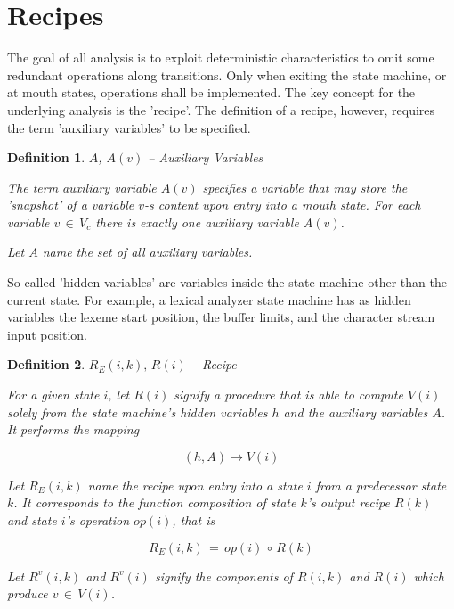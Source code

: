 \documentclass[12pt,a4paper]{scrartcl}
\newtheorem{definition}{Definition}
\begin{document}
%
\section{Recipes}

The goal of all analysis is to exploit deterministic characteristics to omit some
redundant operations along transitions.  Only when exiting the state
machine, or at mouth states, operations shall be implemented. The key concept
for the underlying analysis is the 'recipe'. The definition of a recipe,
however, requires the term 'auxiliary variables' to be specified.

\begin{definition} $A$, $A(v)$ -- Auxiliary Variables

The term auxiliary variable $A(v)$ specifies a variable that may store the
'snapshot' of a variable $v$-s content upon entry into a mouth state. For each
variable $v\,\in\,V_c$ there is exactly one auxiliary variable $A(v)$.
   
Let $A$ name the set of all auxiliary variables.
\end{definition}

So called 'hidden variables' are variables inside the state machine other than
the current state.  For example, a lexical analyzer state machine has as hidden
variables the lexeme start position, the buffer limits, and the character
stream input position.

\begin{definition} $R_E(i,k),\,R(i)$ -- Recipe 

For a given state $i$, let $R(i)$ signify a procedure that is able to compute
$V(i)$ solely from the state machine's hidden variables $h$ and the auxiliary
variables $A$.  It performs the mapping

\begin{equation} \label{eq:recipe-procedure}
    (h, A) \rightarrow V(i)                                             
\end{equation}

Let $R_E(i,k)$ name the recipe upon entry into a state $i$ from a predecessor
state $k$. It corresponds to the \textit{function composition} of state $k$'s
output recipe $R(k)$ and state $i$'s operation $op(i)$, that is

\begin{equation} \label{eq:entry-recipe-concatenated}
    R_E(i,k) \,=\, op(i)\, \circ \, R(k)
\end{equation}

Let $R^v(i,k)$ and $R^v(i)$ signify the components of $R(i,k)$ and $R(i)$ which
produce $v\,\in\,V(i)$.  

\end{definition}
\end{document}
